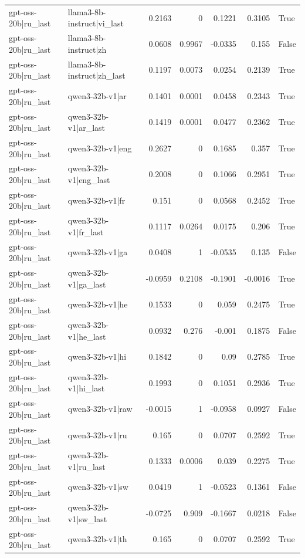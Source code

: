 \begin{table}
\begin{tabular}{l l r r r r l}
gpt-oss-20b|ru_last & llama3-8b-instruct|vi_last & 0.2163 & 0 & 0.1221 & 0.3105 & True \\
gpt-oss-20b|ru_last & llama3-8b-instruct|zh & 0.0608 & 0.9967 & -0.0335 & 0.155 & False \\
gpt-oss-20b|ru_last & llama3-8b-instruct|zh_last & 0.1197 & 0.0073 & 0.0254 & 0.2139 & True \\
gpt-oss-20b|ru_last & qwen3-32b-v1|ar & 0.1401 & 0.0001 & 0.0458 & 0.2343 & True \\
gpt-oss-20b|ru_last & qwen3-32b-v1|ar_last & 0.1419 & 0.0001 & 0.0477 & 0.2362 & True \\
gpt-oss-20b|ru_last & qwen3-32b-v1|eng & 0.2627 & 0 & 0.1685 & 0.357 & True \\
gpt-oss-20b|ru_last & qwen3-32b-v1|eng_last & 0.2008 & 0 & 0.1066 & 0.2951 & True \\
gpt-oss-20b|ru_last & qwen3-32b-v1|fr & 0.151 & 0 & 0.0568 & 0.2452 & True \\
gpt-oss-20b|ru_last & qwen3-32b-v1|fr_last & 0.1117 & 0.0264 & 0.0175 & 0.206 & True \\
gpt-oss-20b|ru_last & qwen3-32b-v1|ga & 0.0408 & 1 & -0.0535 & 0.135 & False \\
gpt-oss-20b|ru_last & qwen3-32b-v1|ga_last & -0.0959 & 0.2108 & -0.1901 & -0.0016 & True \\
gpt-oss-20b|ru_last & qwen3-32b-v1|he & 0.1533 & 0 & 0.059 & 0.2475 & True \\
gpt-oss-20b|ru_last & qwen3-32b-v1|he_last & 0.0932 & 0.276 & -0.001 & 0.1875 & False \\
gpt-oss-20b|ru_last & qwen3-32b-v1|hi & 0.1842 & 0 & 0.09 & 0.2785 & True \\
gpt-oss-20b|ru_last & qwen3-32b-v1|hi_last & 0.1993 & 0 & 0.1051 & 0.2936 & True \\
gpt-oss-20b|ru_last & qwen3-32b-v1|raw & -0.0015 & 1 & -0.0958 & 0.0927 & False \\
gpt-oss-20b|ru_last & qwen3-32b-v1|ru & 0.165 & 0 & 0.0707 & 0.2592 & True \\
gpt-oss-20b|ru_last & qwen3-32b-v1|ru_last & 0.1333 & 0.0006 & 0.039 & 0.2275 & True \\
gpt-oss-20b|ru_last & qwen3-32b-v1|sw & 0.0419 & 1 & -0.0523 & 0.1361 & False \\
gpt-oss-20b|ru_last & qwen3-32b-v1|sw_last & -0.0725 & 0.909 & -0.1667 & 0.0218 & False \\
gpt-oss-20b|ru_last & qwen3-32b-v1|th & 0.165 & 0 & 0.0707 & 0.2592 & True \\

\end{tabular}
\end{table}
